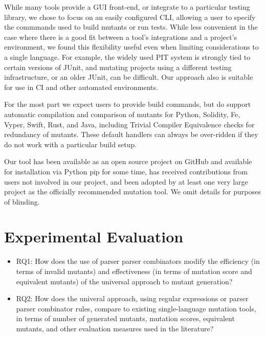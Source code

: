 \documentclass[sigconf,review, anonymous]{acmart}
\begin{document}
{While many tools provide a GUI front-end, or integrate to a particular
testing library, we chose to focus on an easily configured CLI,
allowing a user to specify the commmands used to build mutants or
run tests.  While less convenient in the case where there is a good
fit between a tool's integrations and a project's environment, we
found this flexibility useful even when limiting considerations to a
single language.  For example, the widely used PIT system is strongly tied to
certain versions of JUnit, and mutating projects using a different
testing infrastructure, or an older JUnit, can be difficult.  Our
approach also is suitable for use in CI and other automated environments.

For the most part we expect users to provide build commands, but do
support automatic compilation and comparison of mutants for Python,
Solidity, Fe, Vyper, Swift, Rust, and Java, including Trivial Compiler
Equivalence \cite{TCE} checks for redundancy of mutants.  These
default handlers can always be over-ridden if they do not work with a
particular build setup.

Our tool has been available as an open source project on GitHub and
available for installation via Python pip for
some time, has received contributions from users not involved in
our project, and been adopted by at least one very large project as
the officially recommended mutation tool.  We omit details for
purposes of blinding.

\section{Experimental Evaluation}

\begin{itemize}

  \item{RQ1:}  How does the use of parser parser combinators modify 
    the efficiency (in terms of invalid mutants) and effectiveness (in
    terms of mutation score and equivalent mutants) of the universal
    approach to mutant generation?

\item{RQ2:}  How does the univeral approach, using regular expressions
  or parser parser combinator rules, compare to existing
  single-language mutation tools, in terms of number of generated
  mutants, mutation scores, equivalent mutants, and other evaluation measures used in the literature?

\end{itemize}


}
\end{document}
